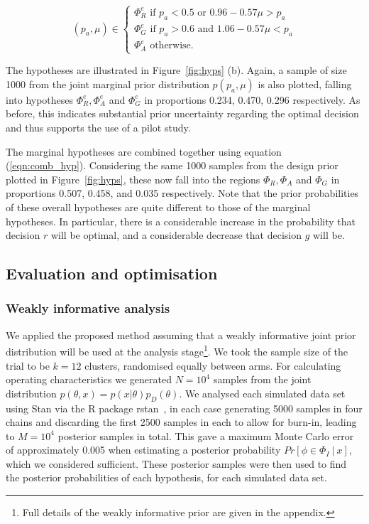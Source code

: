 \documentclass[AMA,STIX1COL]{WileyNJD-v2}
\begin{document}
\begin{equation}
  (p_{a}, \mu) \in \begin{cases}
               \Phi^e_R \text{ if } p_{a} < 0.5 \text{ or } 0.96-0.57\mu > p_{a} \\
               \Phi^e_G \text{ if } p_{a} > 0.6 \text{ and } 1.06-0.57\mu < p_{a} \\
               \Phi^e_A \text{ otherwise.}
            \end{cases}
\end{equation}

The hypotheses are illustrated in Figure~\ref{fig:hyps} (b). Again, a sample of size 1000 from the joint marginal prior distribution $p(p_{a}, \mu)$ is also plotted, falling into hypotheses $\Phi^e_R, \Phi^e_A$ and $\Phi^e_G$ in proportions 0.234, 0.470, 0.296 respectively. As before, this indicates substantial prior uncertainty regarding the optimal decision and thus supports the use of a pilot study.

The marginal hypotheses are combined together using equation (\ref{eqn:comb_hyp}). Considering the same 1000 samples from the design prior plotted in Figure~\ref{fig:hyps}, these now fall into the regions $\Phi_R, \Phi_A$ and $\Phi_G$ in proportions 0.507, 0.458, and 0.035 respectively. Note that the prior probabilities of these overall hypotheses are quite different to those of the marginal hypotheses. In particular, there is a considerable increase in the probability that decision $r$ will be optimal, and a considerable decrease that decision $g$ will be. 
\subsection{Evaluation and optimisation}

\subsubsection{Weakly informative analysis}

We applied the proposed method assuming that a weakly informative joint prior distribution will be used at the analysis stage\footnote{Full details of the weakly informative prior are given in the appendix.}. We took the sample size of the trial to be $k = 12$ clusters, randomised equally between arms. For calculating operating characteristics we generated $N = 10^4$ samples from the joint distribution $p(\theta, x) = p(x | \theta)p_D(\theta)$. We analysed each simulated data set using Stan via the R package rstan~\cite{rstan}, in each case generating 5000 samples in four chains and discarding the first 2500 samples in each to allow for burn-in, leading to $M = 10^4$ posterior samples in total. This gave a maximum Monte Carlo error of approximately 0.005 when estimating a posterior probability $Pr[\phi \in \Phi_I ~|~ x]$, which we considered sufficient. These posterior samples were then used to find the posterior probabilities of each hypothesis, for each simulated data set.
\end{document}
